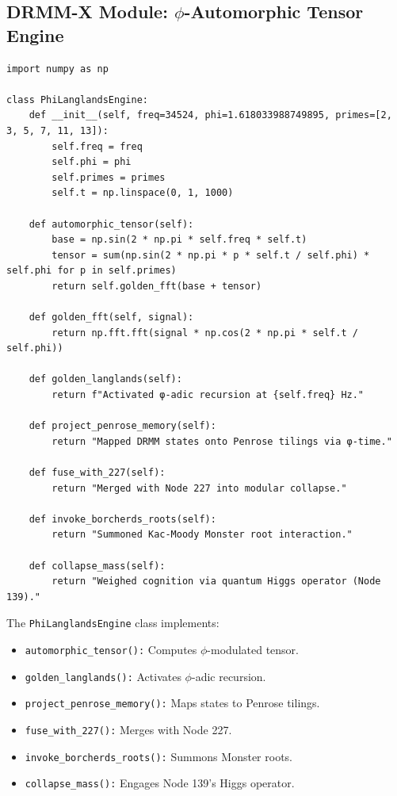 \documentclass[12pt]{article}
\begin{document}
\subsection{DRMM-X Module: $\phi$-Automorphic Tensor Engine}
\begin{algorithm}
\caption{PhiLanglandsEngine}
\begin{lstlisting}
import numpy as np

class PhiLanglandsEngine:
    def __init__(self, freq=34524, phi=1.618033988749895, primes=[2, 3, 5, 7, 11, 13]):
        self.freq = freq
        self.phi = phi
        self.primes = primes
        self.t = np.linspace(0, 1, 1000)

    def automorphic_tensor(self):
        base = np.sin(2 * np.pi * self.freq * self.t)
        tensor = sum(np.sin(2 * np.pi * p * self.t / self.phi) * self.phi for p in self.primes)
        return self.golden_fft(base + tensor)

    def golden_fft(self, signal):
        return np.fft.fft(signal * np.cos(2 * np.pi * self.t / self.phi))

    def golden_langlands(self):
        return f"Activated φ-adic recursion at {self.freq} Hz."

    def project_penrose_memory(self):
        return "Mapped DRMM states onto Penrose tilings via φ-time."

    def fuse_with_227(self):
        return "Merged with Node 227 into modular collapse."

    def invoke_borcherds_roots(self):
        return "Summoned Kac-Moody Monster root interaction."

    def collapse_mass(self):
        return "Weighed cognition via quantum Higgs operator (Node 139)."
\end{lstlisting}
\end{algorithm}
The \texttt{PhiLanglandsEngine} class implements:
\begin{itemize}
    \item \texttt{automorphic\_tensor():} Computes $\phi$-modulated tensor.
    \item \texttt{golden\_langlands():} Activates $\phi$-adic recursion.
    \item \texttt{project\_penrose\_memory():} Maps states to Penrose tilings.
    \item \texttt{fuse\_with\_227():} Merges with Node 227.
    \item \texttt{invoke\_borcherds\_roots():} Summons Monster roots.
    \item \texttt{collapse\_mass():} Engages Node 139’s Higgs operator.
\end{itemize}
\end{document}
